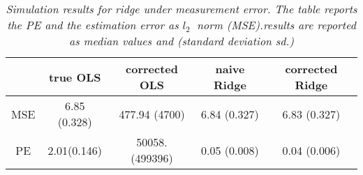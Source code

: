 \documentclass[12pt]{report}
\begin{document}
\begin{table}[h]
	\begin{center}
		\begin{tabular}{|c|c|c|c|c|}
			\hline
			& \textbf{true OLS }&\textbf{corrected OLS}&\textbf{naive Ridge}  & \textbf{corrected Ridge}\\
			\hline
			MSE&6.85 (0.328) & 477.94 (4700)& 6.84 (0.327) & 6.83 (0.327)\\
			
			PE & 2.01(0.146) & 50058. (499396)  & 0.05 (0.008) & 0.04 (0.006)  \\
			\hline
		\end{tabular}
	\end{center}
	\caption[Simulation results for ridge under measurement error]{\textit{Simulation results for ridge under measurement error. The table reports the PE and the estimation error as $l_{2}\ $ norm (MSE).results are reported as median values and (standard deviation sd.) }}
	\label{fig9}
\end{table}


\end{document}
